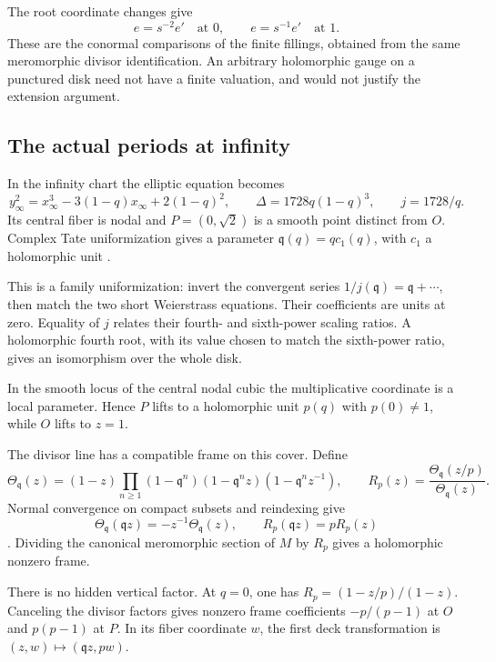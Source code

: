 \documentclass[11pt]{article}
\numberwithin{equation}{section}
\begin{document}
The root coordinate changes give
\[
 e=s^{-2}e'\quad\text{at }0,\qquad
 e=s^{-1}e'\quad\text{at }1.
\]
These are the conormal comparisons of the finite fillings, obtained
from the same meromorphic divisor identification. An arbitrary
holomorphic gauge on a punctured disk need not have a finite
valuation, and would not justify the extension argument.

\subsection{The actual periods at infinity}

In the infinity chart the elliptic equation becomes
\[
 y_\infty^2=x_\infty^3-3(1-q)x_\infty+2(1-q)^2,
 \qquad \Delta=1728q(1-q)^3,\qquad j=1728/q.
\]
Its central fiber is nodal and $P=(0,\sqrt2)$ is a smooth point
distinct from $O$. Complex Tate uniformization gives a parameter
$\mathfrak q(q)=q c_1(q)$, with $c_1$ a holomorphic unit
\cite[pp.~1--7]{TateElliptic}.

This is a family uniformization:
invert the convergent series $1/j(\mathfrak q)=\mathfrak q+\cdots$,
then match the two short Weierstrass equations. Their coefficients
are units at zero. Equality of $j$ relates their fourth- and
sixth-power scaling ratios. A holomorphic fourth root, with its
value chosen to match the sixth-power ratio, gives an isomorphism
over the whole disk.

In the smooth locus of the central nodal
cubic the multiplicative coordinate is a local parameter. Hence $P$
lifts to a holomorphic unit $p(q)$ with $p(0)\ne1$, while $O$ lifts
to $z=1$.

The divisor line has a compatible frame on this cover. Define
\[
 \Theta_{\mathfrak q}(z)=(1-z)\prod_{n\geq1}
 (1-\mathfrak q^n)(1-\mathfrak q^n z)(1-\mathfrak q^n z^{-1}),
 \qquad R_p(z)=\frac{\Theta_{\mathfrak q}(z/p)}
                         {\Theta_{\mathfrak q}(z)}.
\]
Normal convergence on compact subsets and reindexing give
\[
 \Theta_{\mathfrak q}(\mathfrak q z)=-z^{-1}\Theta_{\mathfrak q}(z),
 \qquad R_p(\mathfrak q z)=pR_p(z)
\]
\cite[p.~15]{TateElliptic}. Dividing the canonical meromorphic
section of $M$ by $R_p$ gives a holomorphic nonzero frame.

There is no hidden vertical factor. At $q=0$, one has
$R_p=(1-z/p)/(1-z)$. Canceling the divisor factors gives nonzero
frame coefficients $-p/(p-1)$ at $O$ and $p(p-1)$ at $P$.
In its fiber coordinate $w$, the first deck transformation is
$(z,w)\mapsto(\mathfrak q z,pw)$.
\end{document}
